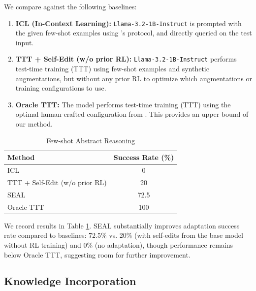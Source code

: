 \documentclass{article}
\newcommand{\methodacronym}{SEAL\xspace}
\begin{document}
We compare against the following baselines:

\begin{enumerate}[left=0pt]
\item \textbf{ICL (In-Context Learning):} \texttt{Llama-3.2-1B-Instruct} is prompted with the given few-shot examples using \citet{akyurek2025TTT}'s protocol, and directly queried on the test input.
\vspace{-2pt}
\item \textbf{TTT + Self-Edit (w/o prior RL):} \texttt{Llama-3.2-1B-Instruct} performs test-time training (TTT) using few-shot examples and synthetic augmentations, but without any prior RL to optimize which augmentations or training configurations to use. 
\vspace{-2pt}
\item \textbf{Oracle TTT:} The model performs test-time training (TTT) using the optimal human-crafted configuration from \citet{akyurek2025TTT}. This provides an upper bound of our method. 
\end{enumerate}

\begin{table}[ht]
    \vspace{-6pt}
    \centering
    \begin{tabular}{l c}
        \toprule
        \textbf{Method} & \textbf{Success Rate (\%)} \\
        \midrule
        ICL & 0 \\
        TTT + Self-Edit (w/o prior RL) & 20 \\
        \methodacronym & 72.5 \\
        Oracle TTT & 100 \\
        \bottomrule
    \end{tabular}
    \label{tab:methods_comparison}
    \vspace{6pt}
    \caption{Few-shot Abstract Reasoning}
    \vspace{-16pt}
\end{table}

We record results in Table \ref{tab:methods_comparison}. \methodacronym{} substantially improves adaptation success rate compared to baselines: 72.5\% vs. 20\% (with self-edits from the base model without RL training) and 0\% (no adaptation), though performance remains below Oracle TTT, suggesting room for further improvement.

\subsection{Knowledge Incorporation}
\end{document}
